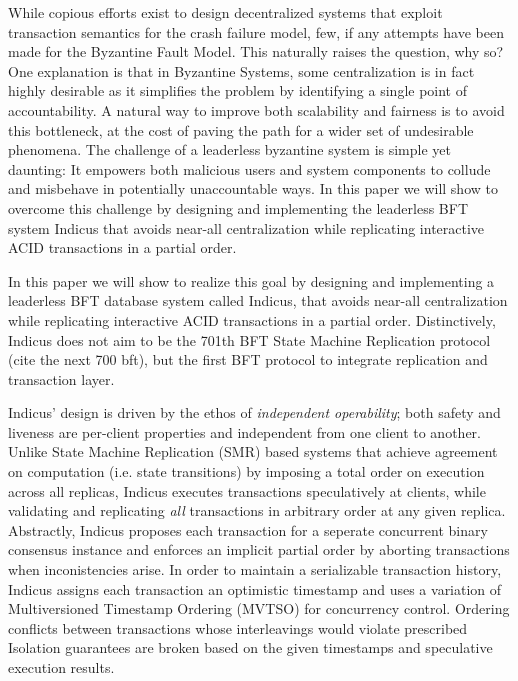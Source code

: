 While copious efforts exist to design decentralized systems that exploit transaction semantics for the crash failure model, few, if any attempts have been made for the Byzantine Fault Model. This naturally raises the question, why so? One explanation is that in Byzantine Systems, some centralization is in fact highly desirable as it simplifies the problem by identifying a single point of accountability. A natural way to improve both scalability and fairness is to avoid this bottleneck, at the cost of paving the path for a wider set of undesirable phenomena. The challenge of a leaderless byzantine system is simple yet daunting: It empowers both malicious users and system components to collude and misbehave in potentially unaccountable ways.
In this paper we will show to overcome this challenge by designing and implementing the leaderless BFT system Indicus that avoids near-all centralization while replicating interactive ACID transactions in a partial order. 
\\
\fi

In this paper we will show to realize this goal by designing and implementing a leaderless BFT database system called Indicus, that avoids near-all centralization while replicating interactive ACID transactions in a partial order. Distinctively, Indicus does not aim to be the 701th BFT State Machine Replication protocol (cite the next 700 bft), but the first BFT protocol to integrate replication and transaction layer.

Indicus' design is driven by the ethos of \textit{independent operability}; both safety  and liveness  are per-client properties and independent from one client to another.
 Unlike State Machine Replication (SMR) based systems that achieve agreement on computation (i.e. state transitions) by imposing a total order on execution across all replicas, Indicus executes transactions speculatively at clients, while validating and replicating \textit{all } transactions in arbitrary order at any given replica. Abstractly, Indicus proposes each transaction for a seperate concurrent binary consensus instance and enforces an implicit partial order by aborting transactions when inconistencies arise. In order to maintain a serializable transaction history, Indicus assigns each transaction an optimistic timestamp and uses a variation of Multiversioned Timestamp Ordering (MVTSO) for concurrency control. Ordering conflicts between transactions whose interleavings would violate prescribed Isolation guarantees are broken based on the given timestamps and speculative execution results. \\

